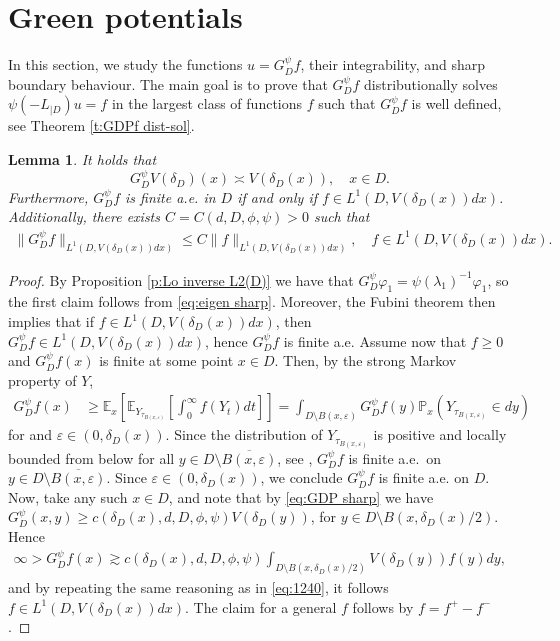 \documentclass[12pt,a4paper,onecolumn]{article}
\newtheorem{lem}[thm]{Lemma}
\theoremstyle{definition}
\newcommand{\p}{\mathds{P}}
\newcommand{\ex}{\mathds{E}}
\newcommand{\1}{\mathbf 1}
\newcommand{\de}{\delta_D}
\newcommand{\LLL}{L^1(D,V(\de(x))dx)}
\newcommand{\Lo}{\psi(-L_{|D})}
\newcommand{\GDP}{G_D^\psi}
\numberwithin{equation}{section}
\begin{document}
	\section{Green potentials}\label{s:Green}

    In this section, we study the functions $u=\GDP f$, their integrability, and sharp boundary behaviour. The main goal is to prove that $\GDP f$ distributionally solves $\Lo u=f$ in the largest class of functions $f$ such that $\GDP f$ is well defined, see  Theorem \ref{t:GDPf dist-sol}.

	\begin{lem}\label{l:Green invariant}
		It holds that
		$$\GDP V(\de)(x)\asymp V(\de(x)), \quad x\in D.$$
		Furthermore, $\GDP f$ is finite a.e. in $D$ if and
		only if $f\in \LLL$. Additionally, there  exists $C=C(d,D,\phi,\psi)>0$ such that 
		\begin{align*}
			\| \GDP f\|_{\LLL}\le C\|f\|_{\LLL}, \quad f\in \LLL.
		\end{align*}
	\end{lem}
	\begin{proof}
By Proposition \ref{p:Lo inverse L2(D)}  we have that $\GDP
		\varphi_1=\psi(\lambda_1)^{-1}\varphi_1$, so the first claim follows from
		\eqref{eq:eigen sharp}. Moreover, the Fubini theorem then implies that if $f\in \LLL$, then $\GDP f\in \LLL$, hence $\GDP f$ is finite a.e. Assume now that $f\ge 0$ and $\GDP f(x)$ is finite at some point $x\in D$. Then, by the strong Markov property of $Y$, 
		\begin{align*}
			\GDP f(x)&\ge  %
			 \ex_x\left[\ex_{Y_{ \tau_{B(x,\varepsilon)} } } \left[\int_0^\infty f(Y_t)dt\right]\right]=\int_{D\setminus B(x,\varepsilon)}\GDP f(y)\p_x(Y_{\tau_{B(x,\varepsilon)}}\in dy)
		\end{align*}
		for and $\varepsilon\in (0, \de(x))$. Since the distribution of $Y_{\tau_{B(x,\varepsilon)}}$ is positive and locally bounded from below for all $y\in D\setminus \overline{B(x,\varepsilon)}$, see \cite[p.~146-148]{ksv2020boundary}, $\GDP f$ is finite a.e.~on $y\in D\setminus \overline{B(x,\varepsilon)}$. Since $\varepsilon\in (0, \de(x))$, we conclude $\GDP f$ is finite a.e. on $D$. Now, take any such $x\in D$,  and note that by \eqref{eq:GDP sharp} we have $\GDP(x,y)\ge c(\de(x),d,D,\phi,\psi) V(\de(y))$, for $y\in D\setminus B(x,\de(x)/2)$. Hence
		\begin{align}\label{eq:1240}
			\infty>\GDP f(x)\gtrsim c(\de(x),d,D,\phi,\psi) \int_{D\setminus B(x,\de(x)/2)}V(\de(y))f(y)dy,
		\end{align}
		and by repeating the same reasoning as in \eqref{eq:1240}, it follows $f\in \LLL$. The claim for a general $f$ follows by $f=f^+-f^-$.
    \end{proof}
\end{document}
